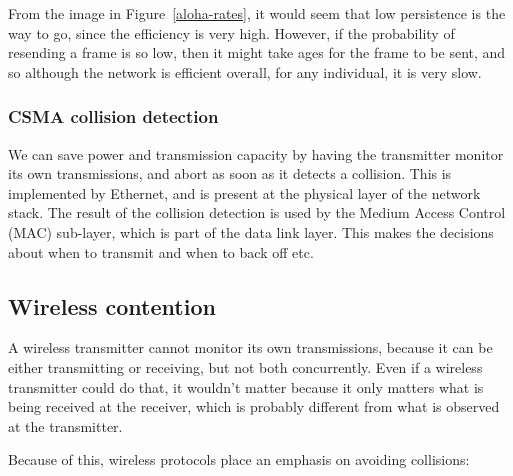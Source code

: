 From the image in Figure~\ref{aloha-rates}, it would seem that low persistence
is the way to go, since the efficiency is very high. However, if the probability
of resending a frame is so low, then it might take ages for the frame to be
sent, and so although the network is efficient overall, for any individual, it
is very slow.

\subsubsection{CSMA collision detection}


We can save power and transmission capacity by having the transmitter monitor
its own transmissions, and abort as soon as it detects a collision. This is
implemented by Ethernet, and is present at the physical layer of the network
stack. The result of the collision detection is used by the Medium Access
Control (MAC) sub-layer, which is part of the data link layer. This makes the
decisions about when to transmit and when to back off etc.

\subsection{Wireless contention}

A wireless transmitter cannot monitor its own transmissions, because it can be
either transmitting or receiving, but not both concurrently. Even if a wireless
transmitter could do that, it wouldn't matter because it only matters what is
being received at the receiver, which is probably different from what is
observed at the transmitter.

Because of this, wireless protocols place an emphasis on avoiding collisions:


